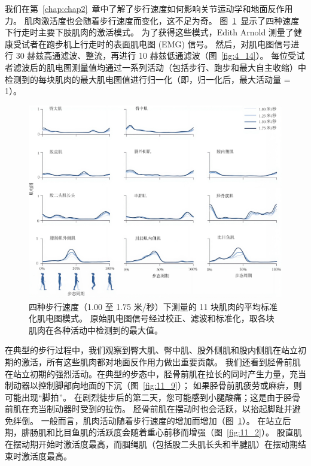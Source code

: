 我们在第~\ref{chap:chap2}~章中了解了步行速度如何影响关节运动学和地面反作用力。
肌肉激活度也会随着步行速度而变化，这不足为奇。
图~\ref{fig:11_8}~显示了四种速度下行走时主要下肢肌肉的激活模式。
为了获得这些模式，Edith Arnold 测量了健康受试者在跑步机上行走时的表面肌电图 (EMG) 信号。
然后，对肌电图信号进行 30 赫兹高通滤波、整流，再进行 10 赫兹低通滤波（图~\ref{fig:4_14}）。
每位受试者滤波后的肌电图测量值均通过一系列活动（包括步行、跑步和最大自主收缩）中检测到的每块肌肉的最大肌电图值进行归一化（即，归一化后，最大活动量 = 1）。


\begin{figure}[!htb]
	\centering
	\includegraphics[width=1.0\linewidth]{chap11/11_8}
	\caption{四种步行速度（1.00 至 1.75 米/秒）下测量的 11 块肌肉的平均标准化肌电图模式。
		原始肌电图信号经过校正、滤波和标准化，取各块肌肉在各种活动中检测到的最大值\cite{arnold2013muscle}。 \label{fig:11_8}}
\end{figure}


在典型的步行过程中，我们观察到臀大肌、臀中肌、股外侧肌和股内侧肌在站立初期的激活，所有这些肌肉都对地面反作用力做出重要贡献。
我们还看到胫骨前肌在站立初期的强烈活动。在典型的步态中，胫骨前肌在拉长的同时产生力量，充当制动器以控制脚部向地面的下沉（图~\ref{fig:11_9}）；
如果胫骨前肌疲劳或麻痹，则可能出现“脚拍”。
在剧烈徒步后的第二天，您可能感到小腿酸痛；这是由于胫骨前肌在充当制动器时受到的拉伤。
胫骨前肌在摆动时也会活跃，以抬起脚趾并避免绊倒。
一般而言，肌肉活动随着步行速度的增加而增加（图~\ref{fig:11_8}）。
在站立后期，腓肠肌和比目鱼肌的活跃度会随着重心前移而增强（图~\ref{fig:11_2}）。
股直肌在摆动期开始时激活度最高，而腘绳肌（包括股二头肌长头和半腱肌）在摆动期结束时激活度最高。


